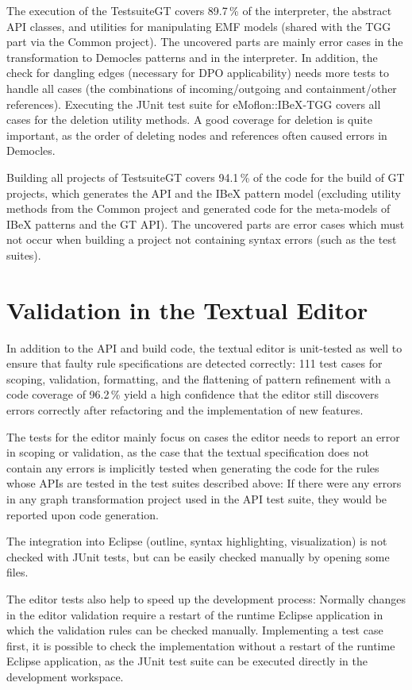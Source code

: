 \noindent
The execution of the TestsuiteGT covers 89.7\,\% of the interpreter, the abstract API classes, and utilities for manipulating EMF models (shared with the TGG part via the Common project).
The uncovered parts are mainly error cases in the transformation to Democles patterns and in the interpreter.
In addition, the check for dangling edges (necessary for DPO applicability) needs more tests to handle all cases (the combinations of incoming/outgoing and containment/other references).
Executing the JUnit test suite for eMoflon::IBeX-TGG covers all cases for the deletion utility methods.
A good coverage for deletion is quite important, as the order of deleting nodes and references often caused errors in Democles.

Building all projects of TestsuiteGT covers 94.1\,\% of the code for the build of GT projects, which generates the API and the IBeX pattern model (excluding utility methods from the Common project and generated code for the meta-models of IBeX patterns and the GT API).
The uncovered parts are error cases which must not occur when building a project not containing syntax errors (such as the test suites).


\section{Validation in the Textual Editor}
\label{evaluation-validation}
In addition to the API and build code, the textual editor is unit-tested as well to ensure that faulty rule specifications are detected correctly:
111 test cases for scoping, validation, formatting, and the flattening of pattern refinement with a code coverage of 96.2\,\% yield a high confidence that the editor still discovers errors correctly after refactoring and the implementation of new features.

The tests for the editor mainly focus on cases the editor needs to report an error in scoping or validation, as the case that the textual specification does not contain any errors is implicitly tested when generating the code for the rules whose APIs are tested in the test suites described above:
If there were any errors in any graph transformation project used in the API test suite, they would be reported upon code generation.

The integration into Eclipse (\eg outline, syntax highlighting, visualization) is not checked with JUnit tests, but can be easily checked manually by opening some files.

The editor tests also help to speed up the development process:
Normally changes in the editor validation require a restart of the runtime Eclipse application in which the validation rules can be checked manually.
Implementing a test case first, it is possible to check the implementation without a restart of the runtime Eclipse application, as the JUnit test suite can be executed directly in the development workspace.


